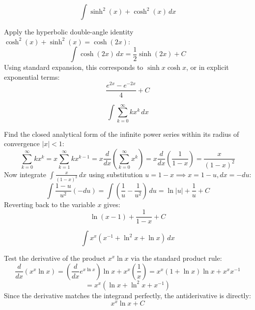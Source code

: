 \begin{questions}
    \question \[ \int \sinh^2(x) + \cosh^2(x) \,dx \]
    \begin{solution}
        Apply the hyperbolic double-angle identity $\cosh^2(x) + \sinh^2(x) = \cosh(2x)$:
        \[ \int \cosh(2x) \,dx = \frac{1}{2}\sinh(2x) + C \]
        Using standard expansion, this corresponds to $\sinh x \cosh x$, or in explicit exponential terms:
        \[ \frac{e^{2x} - e^{-2x}}{4} + C \]
    \end{solution}

    \question \[ \int \sum_{k=0}^\infty k x^k \,dx \]
    \begin{solution}
        Find the closed analytical form of the infinite power series within its radius of convergence $|x| < 1$:
        \[ \sum_{k=0}^\infty k x^k = x \sum_{k=1}^\infty k x^{k-1} = x \frac{d}{dx}\left(\sum_{k=0}^\infty x^k\right) = x \frac{d}{dx}\left(\frac{1}{1-x}\right) = \frac{x}{(1-x)^2} \]
        Now integrate $\int \frac{x}{(1-x)^2} \,dx$ using substitution $u = 1-x \implies x = 1-u, dx = -du$:
        \[ \int \frac{1-u}{u^2}(-du) = \int \left(\frac{1}{u} - \frac{1}{u^2}\right) \,du = \ln|u| + \frac{1}{u} + C \]
        Reverting back to the variable $x$ gives:
        \[ \ln(x-1) + \frac{1}{1-x} + C \]
    \end{solution}

    \question \[ \int x^x (x^{-1} + \ln^2 x + \ln x) \,dx \]
    \begin{solution}
        Test the derivative of the product $x^x \ln x$ via the standard product rule:
        \[ \frac{d}{dx}(x^x \ln x) = \left(\frac{d}{dx}e^{x\ln x}\right)\ln x + x^x\left(\frac{1}{x}\right) = x^x(1+\ln x)\ln x + x^x x^{-1} \]
        \[ = x^x(\ln x + \ln^2 x + x^{-1}) \]
        Since the derivative matches the integrand perfectly, the antiderivative is directly:
        \[ x^x \ln x + C \]
    \end{solution}


\end{questions}
